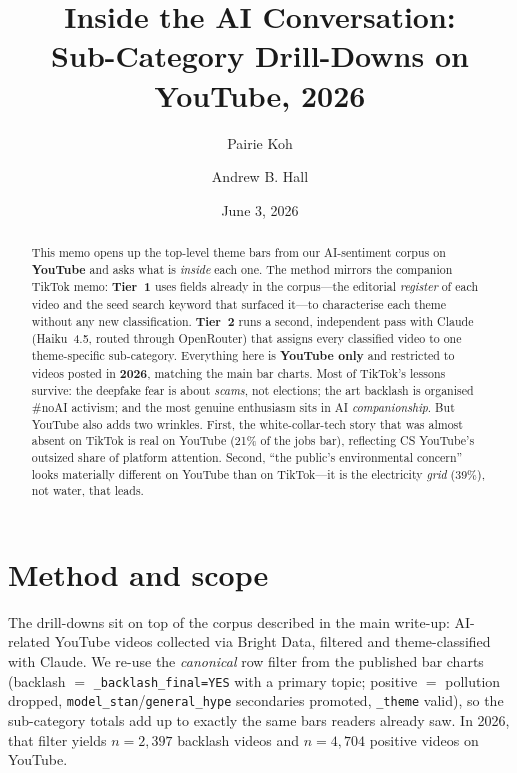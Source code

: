\documentclass[11pt]{article}
\title{\textbf{Inside the AI Conversation:\\ Sub-Category Drill-Downs on YouTube, 2026}}
\author{Pairie Koh \and Andrew B. Hall}
\date{June 3, 2026}
\begin{document}
\maketitle

\begin{abstract}
\noindent This memo opens up the top-level theme bars from our AI-sentiment
corpus on \textbf{YouTube} and asks what is \emph{inside} each one. The method
mirrors the companion TikTok memo: \textbf{Tier~1} uses fields already in the
corpus---the editorial \emph{register} of each video and the seed search keyword
that surfaced it---to characterise each theme without any new classification.
\textbf{Tier~2} runs a second, independent pass with Claude (Haiku~4.5, routed
through OpenRouter) that assigns every classified video to one theme-specific
sub-category. Everything here is \textbf{YouTube only} and restricted to videos
posted in \textbf{2026}, matching the main bar charts. Most of TikTok's lessons
survive: the deepfake fear is about \emph{scams}, not elections; the art backlash
is organised \#noAI activism; and the most genuine enthusiasm sits in AI
\emph{companionship}. But YouTube also adds two wrinkles. First, the
white-collar-tech story that was almost absent on TikTok is real on YouTube
(21\% of the jobs bar), reflecting CS YouTube's outsized share of platform
attention. Second, ``the public's environmental concern'' looks materially
different on YouTube than on TikTok---it is the electricity \emph{grid} (39\%),
not water, that leads.
\end{abstract}

\tableofcontents
\bigskip

\section{Method and scope}

The drill-downs sit on top of the corpus described in the main write-up:
AI-related YouTube videos collected via Bright Data, filtered and
theme-classified with Claude. We re-use the \emph{canonical} row filter from the
published bar charts (backlash $=$ \texttt{\_backlash\_final=YES} with a primary
topic; positive $=$ pollution dropped, \texttt{model\_stan}/\texttt{general\_hype}
secondaries promoted, \texttt{\_theme} valid), so the sub-category totals add up
to exactly the same bars readers already saw. In 2026, that filter yields
$n=2{,}397$ backlash videos and $n=4{,}704$ positive videos on YouTube.
\end{document}

